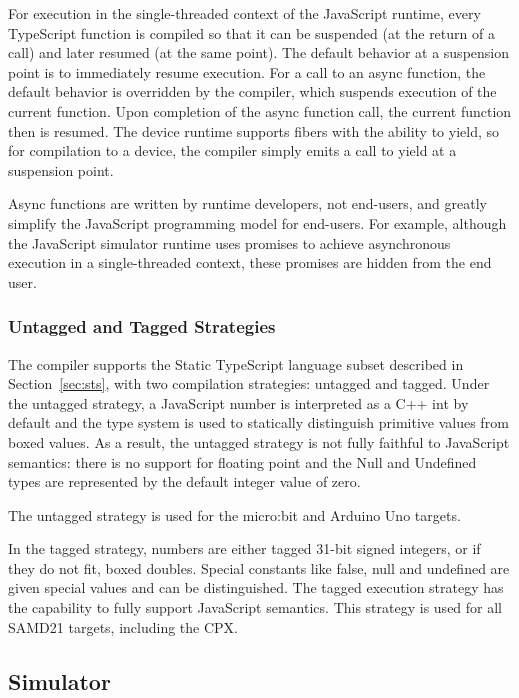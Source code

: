 For execution in the single-threaded context of the JavaScript runtime,
every TypeScript function is compiled so that it can be suspended (at the return of a call) and later resumed (at the same point). 
The default behavior at a suspension point is to immediately resume execution.  For a call to an async function,
the default behavior is overridden by the compiler, which suspends execution of the current function. 
Upon completion of the async function call, the current function then is resumed. 
The \CO device runtime supports fibers with the ability to yield, so for compilation to a device, 
the compiler simply emits a call to yield at a suspension point.

Async functions are written by runtime developers, not end-users, and greatly simplify the JavaScript
programming model for end-users. For example, although the JavaScript simulator runtime uses promises to 
achieve asynchronous execution in a single-threaded context, these promises are hidden from the end user. 

\subsubsection{Untagged and Tagged Strategies}

The \MC compiler supports the Static TypeScript language subset described in Section~\ref{sec:sts},
with two compilation strategies: untagged and tagged. Under the untagged strategy,
a JavaScript number is interpreted as a C++ int by default and the type system is used
to statically distinguish primitive values from boxed values. As a result, the untagged
strategy is not fully faithful to JavaScript semantics: there is no support for floating
point and the Null and Undefined types are represented by the default integer value of zero.

The untagged strategy is used for the micro:bit and Arduino Uno targets. 

In the tagged strategy, numbers are either tagged 31-bit signed integers, or if they do not fit, 
boxed doubles. Special constants like false, null and undefined are given special values 
and can be distinguished. The tagged execution strategy has the capability to fully support
JavaScript semantics. This strategy is used for all SAMD21 targets, including the CPX.

\subsection{Simulator}

